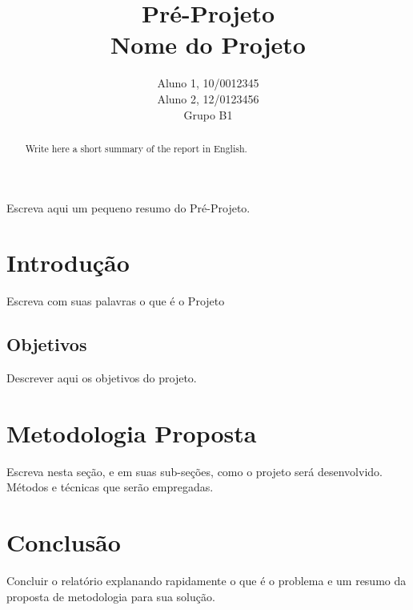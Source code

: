 \documentclass[12pt]{article}
\title{Pré-Projeto\\ 
Nome do Projeto}
\author{Aluno 1, 10/0012345\\
        Aluno 2,  12/0123456\\
        Grupo B1
}
\begin{document}
 
\maketitle

 \begin{abstract}
   Write here a short summary of the report in English.
 \end{abstract}
    
 \begin{resumo} 
  Escreva aqui um pequeno resumo do Pré-Projeto.
 \end{resumo}


\section{Introdução}
\label{sec:Introducao}

Escreva com suas palavras o que é o Projeto

\subsection{Objetivos}
\label{sec:Objetivos}

Descrever aqui os objetivos do projeto.

\section{Metodologia Proposta}
\label{sec:Metodologia}

Escreva nesta seção, e em suas sub-seções, como o projeto será desenvolvido. Métodos e técnicas que serão empregadas. 


\section{Conclusão}
\label{sec:Conclusao}

Concluir o relatório explanando rapidamente o que é o problema e um resumo da proposta de metodologia para sua solução.



\end{document}
